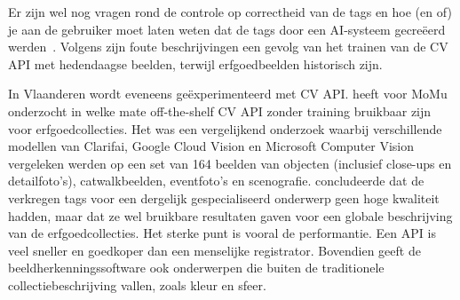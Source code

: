 Er zijn wel nog vragen rond de controle op correctheid van de tags en hoe (en of) je aan de gebruiker moet laten weten dat de tags door een AI-systeem gecre\"{e}erd werden~\autocite{Moriarty2018a}. Volgens \textcite{Hindle2017} zijn foute beschrijvingen een gevolg van het trainen van de CV API met hedendaagse beelden, terwijl erfgoedbeelden historisch zijn.

In Vlaanderen wordt eveneens ge\"{e}xperimenteerd met CV API. \textcite{Vanstappen2019} heeft voor MoMu onderzocht in welke mate off-the-shelf CV API zonder training bruikbaar zijn voor erfgoedcollecties. Het was een vergelijkend onderzoek waarbij verschillende modellen van Clarifai, Google Cloud Vision en Microsoft Computer Vision vergeleken werden op een set van 164 beelden van objecten (inclusief close-ups en detailfoto’s), catwalkbeelden, eventfoto’s en scenografie. \textcite{Vanstappen2019} concludeerde dat de verkregen tags voor een dergelijk gespecialiseerd onderwerp geen hoge kwaliteit hadden, maar dat ze wel bruikbare resultaten gaven voor een globale beschrijving van de erfgoedcollecties. Het sterke punt is vooral de performantie. Een API is veel sneller en goedkoper dan een menselijke registrator. Bovendien geeft de beeldherkenningssoftware ook onderwerpen die buiten de traditionele collectiebeschrijving vallen, zoals kleur en sfeer.

